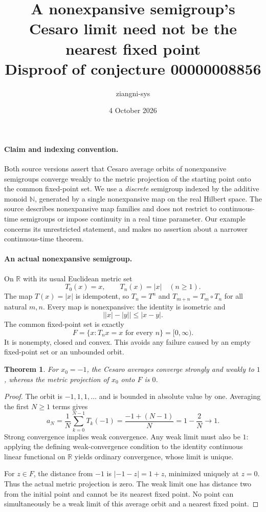 \documentclass[11pt]{article}
\title{A nonexpansive semigroup's Cesaro limit need not be the nearest fixed point\\Disproof of conjecture 00000008856}
\author{ziangni-sys}
\date{4 October 2026}
\newtheorem{theorem}{Theorem}
\begin{document}
\maketitle
\paragraph{Claim and indexing convention.}
Both source versions assert that Cesaro average orbits of nonexpansive semigroups converge weakly to the metric projection of the starting point onto the common fixed-point set. We use a \emph{discrete} semigroup indexed by the additive monoid $\mathbb N$, generated by a single nonexpansive map on the real Hilbert space. The source describes nonexpansive map families and does not restrict to continuous-time semigroups or impose continuity in a real time parameter. Our example concerns its unrestricted statement, and makes no assertion about a narrower continuous-time theorem.

\paragraph{An actual nonexpansive semigroup.}
On $\mathbb R$ with its usual Euclidean metric set
\[
 T_0(x)=x,\qquad T_n(x)=|x|\quad(n\ge1).
\]
The map $T(x)=|x|$ is idempotent, so $T_n=T^n$ and
$T_{m+n}=T_m\circ T_n$ for all natural $m,n$. Every map is nonexpansive: the identity is isometric and
\[
 \bigl||x|-|y|\bigr|\le |x-y|.
\]
The common fixed-point set is exactly
\[
 F=\{x:T_nx=x\text{ for every }n\}=[0,\infty).
\]
It is nonempty, closed and convex. This avoids any failure caused by an empty fixed-point set or an unbounded orbit.

\begin{theorem}
For $x_0=-1$, the Cesaro averages converge strongly and weakly to $1$, whereas the metric projection of $x_0$ onto $F$ is $0$.
\end{theorem}
\begin{proof}
The orbit is $-1,1,1,\ldots$ and is bounded in absolute value by one. Averaging the first $N\ge1$ terms gives
\[
 a_N=\frac1N\sum_{k=0}^{N-1}T_k(-1)=\frac{-1+(N-1)}N
     =1-\frac2N\longrightarrow1.
\]
Strong convergence implies weak convergence. Any weak limit must also be $1$: applying the defining weak-convergence condition to the identity continuous linear functional on $\mathbb R$ yields ordinary convergence, whose limit is unique.

For $z\in F$, the distance from $-1$ is $|-1-z|=1+z$, minimized uniquely at $z=0$. Thus the actual metric projection is zero. The weak limit one has distance two from the initial point and cannot be its nearest fixed point. No point can simultaneously be a weak limit of this average orbit and a nearest fixed point.
\end{proof}
\end{document}
